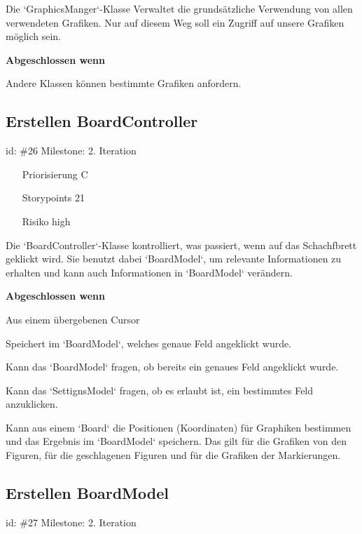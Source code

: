 Die `GraphicsManger`-Klasse Verwaltet die grundsätzliche Verwendung von allen verwendeten Grafiken. Nur auf diesem Weg soll ein Zugriff auf unsere Grafiken möglich sein.

\textbf{Abgeschlossen wenn}
\begin{todolist}
    \item[\done]  Andere Klassen können bestimmte Grafiken anfordern.

\end{todolist}


\subsection*{Erstellen BoardController}
id: \#26 Milestone: 2. Iteration\\

\begin{itemize}
\item[Priorisierung] C
\item[Storypoints] 21
\item[Risiko] high
\end{itemize}

Die `BoardController`-Klasse kontrolliert, was passiert, wenn auf das Schachfbrett geklickt wird. Sie benutzt dabei `BoardModel`, um relevante Informationen zu erhalten und kann auch Informationen in `BoardModel` verändern.

\textbf{Abgeschlossen wenn}
\begin{todolist}
    \item[\done]  Aus einem übergebenen Cursor
  \item[\done]  Speichert im `BoardModel`, welches genaue Feld angeklickt wurde.
  \item[\done]  Kann das `BoardModel` fragen, ob bereits ein genaues Feld angeklickt wurde.
  \item[\done]  Kann das `SettignsModel` fragen, ob es erlaubt ist, ein bestimmtes Feld anzuklicken.
  \item[\done]  Kann aus einem `Board` die Positionen (Koordinaten) für Graphiken bestimmen und das Ergebnis im `BoardModel` speichern. Das gilt für die Grafiken von den Figuren, für die geschlagenen Figuren und für die Grafiken der Markierungen.

\end{todolist}


\subsection*{Erstellen BoardModel}
id: \#27 Milestone: 2. Iteration\\

